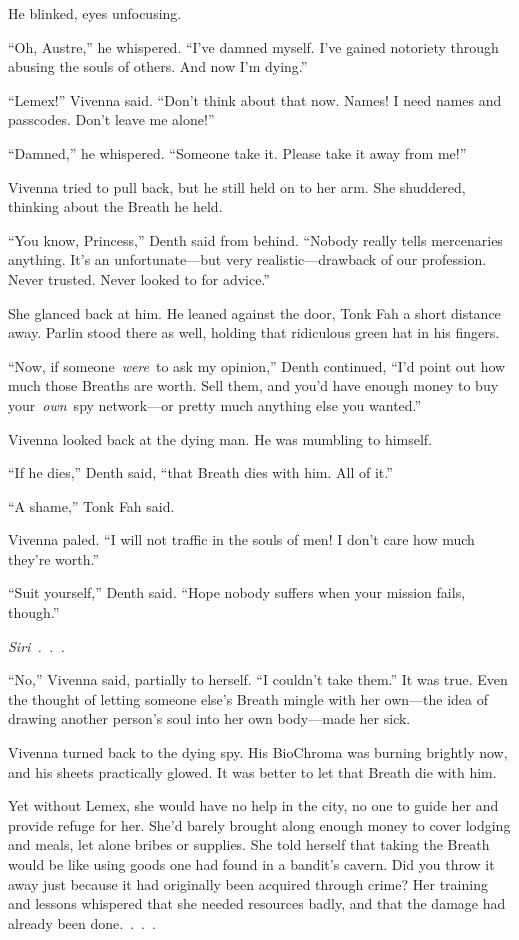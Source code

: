 He blinked, eyes unfocusing.

“Oh, Austre,” he whispered. “I’ve damned myself. I’ve gained notoriety through abusing the souls of others. And now I’m dying.”

“Lemex!” Vivenna said. “Don’t think about that now. Names! I need names and passcodes. Don’t leave me alone!”

“Damned,” he whispered. “Someone take it. Please take it away from me!”

Vivenna tried to pull back, but he still held on to her arm. She shuddered, thinking about the Breath he held.

“You know, Princess,” Denth said from behind. “Nobody really tells mercenaries anything. It’s an unfortunate—but very realistic—drawback of our profession. Never trusted. Never looked to for advice.”

She glanced back at him. He leaned against the door, Tonk Fah a short distance away. Parlin stood there as well, holding that ridiculous green hat in his fingers.

“Now, if someone~\textit{were}~to ask my opinion,” Denth continued, “I’d point out how much those Breaths are worth. Sell them, and you’d have enough money to buy your~\textit{own}~spy network—or pretty much anything else you wanted.”

Vivenna looked back at the dying man. He was mumbling to himself.

“If he dies,” Denth said, “that Breath dies with him. All of it.”

“A shame,” Tonk Fah said.

Vivenna paled. “I will not traffic in the souls of men! I don’t care how much they’re worth.”

“Suit yourself,” Denth said. “Hope nobody suffers when your mission fails, though.”

\textit{Siri~.~.~.}

“No,” Vivenna said, partially to herself. “I couldn’t take them.” It was true. Even the thought of letting someone else’s Breath mingle with her own—the idea of drawing another person’s soul into her own body—made her sick.

Vivenna turned back to the dying spy. His BioChroma was burning brightly now, and his sheets practically glowed. It was better to let that Breath die with him.

Yet without Lemex, she would have no help in the city, no one to guide her and provide refuge for her. She’d barely brought along enough money to cover lodging and meals, let alone bribes or supplies. She told herself that taking the Breath would be like using goods one had found in a bandit’s cavern. Did you throw it away just because it had originally been acquired through crime? Her training and lessons whispered that she needed resources badly, and that the damage had already been done.~.~.~.


